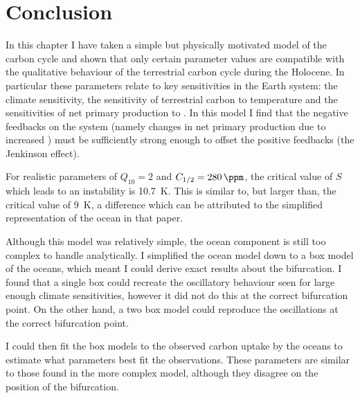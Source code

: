 \section{Conclusion}
In this chapter I have taken a simple but physically motivated model of the carbon cycle and shown that only certain parameter values are compatible with the qualitative behaviour
of the terrestrial carbon cycle during the Holocene. In particular these parameters relate to key sensitivities in the Earth system: the climate sensitivity, the sensitivity of
terrestrial carbon to temperature and the sensitivities of net primary production to . In this model I find that the negative feedbacks on the system (namely changes in net primary
production due to increased ) must be sufficiently strong enough to offset the positive feedbacks (the Jenkinson effect).

For realistic parameters of $Q_{10} = 2$ and $C_{1/2} = \SI{280}{\ppm}$, the critical value of $S$ which leads to an instability is \SI{10.7}{\kelvin}.
This is similar to, but larger than, the~\cite{Cox2006} critical value of \SI{9}{\kelvin}, a difference which can be attributed to the simplified representation of the ocean in that paper.

Although this model was relatively simple, the ocean component is still too complex to handle analytically. I simplified the ocean model down to a box model of the oceans,
which meant I could derive exact results about the bifurcation. I found that a single box could recreate the oscillatory behaviour seen for large enough climate sensitivities,
however it did not do this at the correct bifurcation point. On the other hand, a two box model could reproduce the oscillations at the correct bifurcation point.

I could then fit the box models to the observed carbon uptake by the oceans to estimate what parameters best fit the observations. These parameters are similar to those found in the more
complex model, although they disagree on the position of the bifurcation.